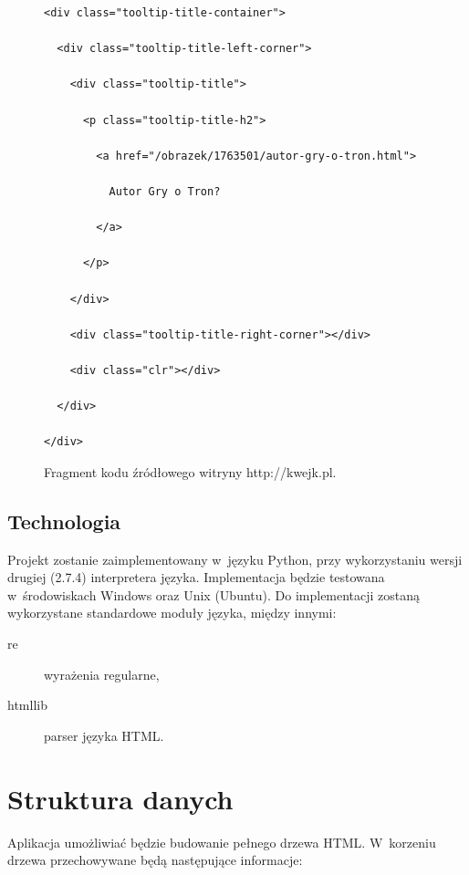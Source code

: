 \documentclass[a4paper,10pt]{article}
\begin{document}
\begin{figure}[h!]
\centering
  \begin{Verbatim}[frame=single,baselinestretch=0.3]
<div class="tooltip-title-container">

  <div class="tooltip-title-left-corner">

    <div class="tooltip-title">

      <p class="tooltip-title-h2">

        <a href="/obrazek/1763501/autor-gry-o-tron.html">

          Autor Gry o Tron?

        </a>

      </p>

    </div>

    <div class="tooltip-title-right-corner"></div>

    <div class="clr"></div>

  </div>

</div>
  \end{Verbatim}
  \caption{Fragment kodu źródłowego witryny http://kwejk.pl.}
  \label{fig:kwejk_listing}
\end{figure}

\subsection*{Technologia}

Projekt zostanie zaimplementowany w~języku Python, przy wykorzystaniu wersji drugiej (2.7.4) interpretera języka. Implementacja będzie testowana w~środowiskach Windows oraz Unix (Ubuntu). Do implementacji zostaną wykorzystane standardowe moduły języka, między innymi:

\begin{description}
 \item[re] wyrażenia regularne,
 \item[htmllib] parser języka HTML.
\end{description}


\section*{Struktura danych}

Aplikacja umożliwiać będzie budowanie pełnego drzewa HTML. W~korzeniu drzewa przechowywane będą następujące informacje:
\end{document}
